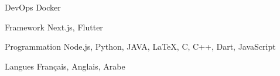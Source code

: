 

\begin{cvskills}

  \cvskill
    {DevOps} %
    {Docker} %

  \cvskill
    {Framework} %
    {Next.js, Flutter} %

  \cvskill
    {Programmation} %
    {Node.js, Python, JAVA, LaTeX, C, C++, Dart, JavaScript} %

  \cvskill
    {Langues} %
    {Français, Anglais, Arabe} %

\end{cvskills}
